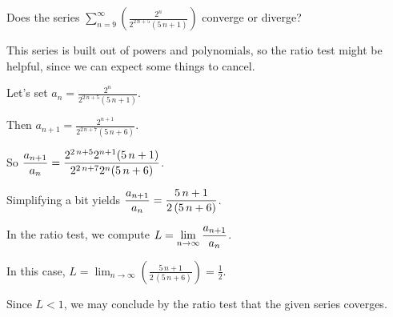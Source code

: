 \documentclass{ximera}
\begin{document}
\begin{question}
  Does the series \(\displaystyle\sum_{n=9}^\infty \left( \displaystyle\frac{2^{n}}{2^{2 \, n + 5} {\left(5 \, n + 1\right)}} \right)\) converge or diverge?
  
  \begin{solution}
    \begin{hint}
      This series is built out of powers and polynomials, so the ratio test might be helpful, since we can expect some things to cancel.
    \end{hint}
    \begin{hint}
      Let's set \(a_n = \displaystyle\frac{2^{n}}{2^{2 \, n + 5} {\left(5 \, n + 1\right)}}\).
    \end{hint}
    \begin{hint}
      Then \(a_{n+1} = \displaystyle\frac{2^{n + 1}}{2^{2 \, n + 7} {\left(5 \, n + 6\right)}}\).
    \end{hint}
    \begin{hint}
      So \(\displaystyle\displaystyle\frac{a_{n+1}}{a_n} = \displaystyle\frac{2^{2 \, n + 5} 2^{n + 1} {\left(5 \, n + 1\right)}}{2^{2 \, n + 7} 2^{n} {\left(5 \, n + 6\right)}}\).
    \end{hint}
    \begin{hint}
      Simplifying a bit yields \(\displaystyle\displaystyle\frac{a_{n+1}}{a_n} = \displaystyle\frac{5 \, n + 1}{2 \, {\left(5 \, n + 6\right)}}\).
    \end{hint}
    \begin{hint}
      In the ratio test, we compute \(L = \displaystyle\lim_{n \to \infty} \displaystyle\displaystyle\frac{a_{n+1}}{a_n}\).
    \end{hint}
    \begin{hint}
      In this case, \(L = \displaystyle\lim_{n \to \infty} \left( \displaystyle\frac{5 \, n + 1}{2 \, {\left(5 \, n + 6\right)}} \right) = \displaystyle\frac{1}{2}\).
    \end{hint}
    \begin{hint}
      Since \(L < 1\), we may conclude by the ratio test that the given series coverges.
    \end{hint}


    \begin{multiple-choice}
    \end{multiple-choice}

  \end{solution}
\end{question}
            
\end{document}
